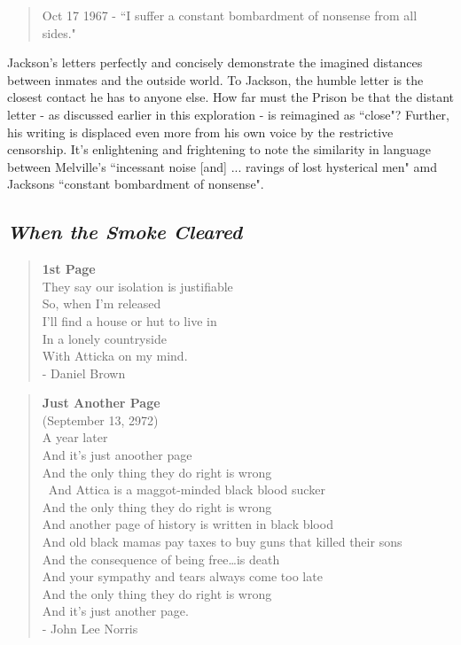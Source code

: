 \documentclass[14pt, letterpaper]{report}
\begin{document}
	\begin{quote}
	Oct 17 1967 - ``I suffer a constant bombardment of nonsense from all 
	sides."\autocite[139]{soledad-brother}
	\end{quote}
	
	Jackson's letters perfectly and concisely demonstrate the imagined distances 
	between inmates and the outside world. To Jackson, the humble letter is the 
	closest contact he has to anyone else. How far must the Prison be that the 
	distant letter - as discussed earlier in this exploration - is reimagined as 
	``close"? Further, his writing is displaced even more from his own voice by 
	the restrictive censorship. It's enlightening and frightening to note the 
	similarity in language between Melville's ``incessant noise [and] ... ravings 
	of lost hysterical men" amd Jacksons ``constant bombardment of nonsense". 
	
	
	\subsection*{\textit{When the Smoke Cleared}}
	\begin{quote}
	\textbf{1st Page}\\
	They say our isolation is justifiable\\
	So, when I'm released\\
	I'll find a house or hut to live in\\
	In a lonely countryside\\
	\hspace*{8ex}With Atticka on my mind.\\
	- Daniel Brown\autocite[36]{attica-poems}
	\end{quote}
	
	\begin{quote}
	\textbf{Just Another Page}\\
	(September 13, 2972)\\
	A year later\\
	And it's just anoother page\\
	And the only thing they do right is wrong\\\
	And Attica is a maggot-minded black blood sucker\\
	And the only thing they do right is wrong\\
	And another page of history is written in black blood\\
	And old black mamas pay taxes to buy guns that killed their sons\\
	And the consequence of being free\ldots is death\\
	And your sympathy and tears always come too late\\
	And the only thing they do right is wrong\\
	\hspace*{16ex}And it's just another page.\\
	- John Lee Norris\autocite[52]{attica-poems}
	\end{quote}
	
\end{document}
